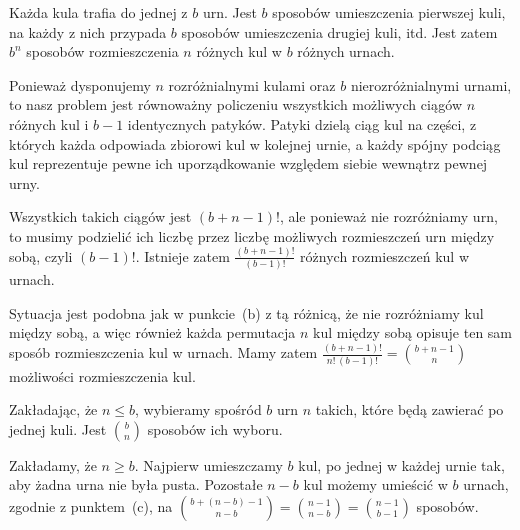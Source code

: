 \problems


\subexercise{} %
Każda kula trafia do jednej z $b$ urn. Jest $b$ sposobów umieszczenia pierwszej kuli, na każdy z nich przypada $b$ sposobów umieszczenia drugiej kuli, itd. Jest zatem $b^n$ sposobów rozmieszczenia $n$ różnych kul w $b$ różnych urnach.

\subexercise{} %
Ponieważ dysponujemy $n$ rozróżnialnymi kulami oraz $b$ nierozróżnialnymi urnami, to nasz problem jest równoważny policzeniu wszystkich możliwych ciągów $n$ różnych kul i $b-1$ identycznych patyków. Patyki dzielą ciąg kul na części, z których każda odpowiada zbiorowi kul w kolejnej urnie, a każdy spójny podciąg kul reprezentuje pewne ich uporządkowanie względem siebie wewnątrz pewnej urny.

Wszystkich takich ciągów jest $(b+n-1)!$, ale ponieważ nie rozróżniamy urn, to musimy podzielić ich liczbę przez liczbę możliwych rozmieszczeń urn między sobą, czyli $(b-1)!$. Istnieje zatem $\frac{(b+n-1)!}{(b-1)!}$ różnych rozmieszczeń kul w urnach.

\subexercise{} %
Sytuacja jest podobna jak w punkcie~(b) z tą różnicą, że nie rozróżniamy kul między sobą, a więc również każda permutacja $n$ kul między sobą opisuje ten sam sposób rozmieszczenia kul w urnach. Mamy zatem $\frac{(b+n-1)!}{n!\,(b-1)!}=\binom{b+n-1}{n}$ możliwości rozmieszczenia kul.

\subexercise{} %
Zakładając, że $n\le b$, wybieramy spośród $b$ urn $n$ takich, które będą zawierać po jednej kuli. Jest $\binom{b}{n}$ sposobów ich wyboru.

\subexercise{} %
Zakładamy, że $n\ge b$. Najpierw umieszczamy $b$ kul, po jednej w każdej urnie tak, aby żadna urna nie była pusta. Pozostałe $n-b$ kul możemy umieścić w $b$ urnach, zgodnie z punktem~(c), na $\binom{b+(n-b)-1}{n-b}=\binom{n-1}{n-b}=\binom{n-1}{b-1}$ sposobów.

\endinput
